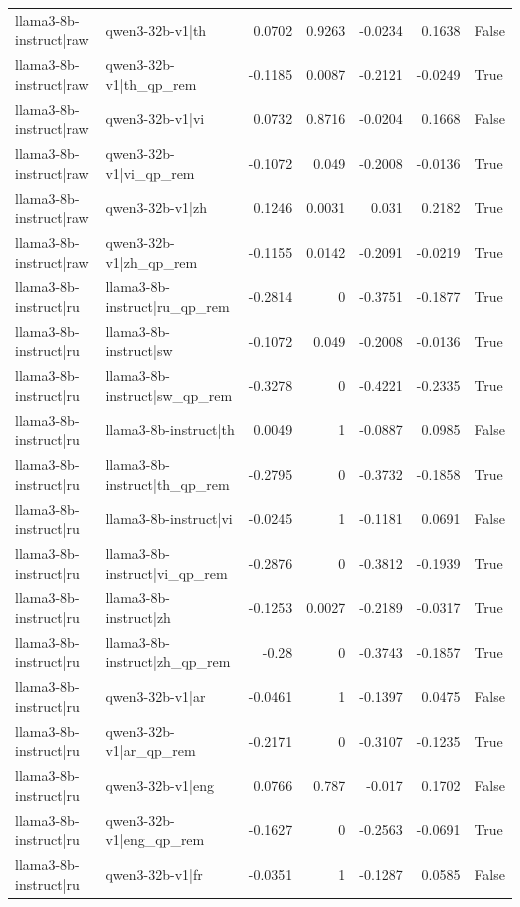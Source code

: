 \begin{table}
\begin{tabular}{l l r r r r l}
llama3-8b-instruct|raw & qwen3-32b-v1|th & 0.0702 & 0.9263 & -0.0234 & 0.1638 & False \\
llama3-8b-instruct|raw & qwen3-32b-v1|th_qp_rem & -0.1185 & 0.0087 & -0.2121 & -0.0249 & True \\
llama3-8b-instruct|raw & qwen3-32b-v1|vi & 0.0732 & 0.8716 & -0.0204 & 0.1668 & False \\
llama3-8b-instruct|raw & qwen3-32b-v1|vi_qp_rem & -0.1072 & 0.049 & -0.2008 & -0.0136 & True \\
llama3-8b-instruct|raw & qwen3-32b-v1|zh & 0.1246 & 0.0031 & 0.031 & 0.2182 & True \\
llama3-8b-instruct|raw & qwen3-32b-v1|zh_qp_rem & -0.1155 & 0.0142 & -0.2091 & -0.0219 & True \\
llama3-8b-instruct|ru & llama3-8b-instruct|ru_qp_rem & -0.2814 & 0 & -0.3751 & -0.1877 & True \\
llama3-8b-instruct|ru & llama3-8b-instruct|sw & -0.1072 & 0.049 & -0.2008 & -0.0136 & True \\
llama3-8b-instruct|ru & llama3-8b-instruct|sw_qp_rem & -0.3278 & 0 & -0.4221 & -0.2335 & True \\
llama3-8b-instruct|ru & llama3-8b-instruct|th & 0.0049 & 1 & -0.0887 & 0.0985 & False \\
llama3-8b-instruct|ru & llama3-8b-instruct|th_qp_rem & -0.2795 & 0 & -0.3732 & -0.1858 & True \\
llama3-8b-instruct|ru & llama3-8b-instruct|vi & -0.0245 & 1 & -0.1181 & 0.0691 & False \\
llama3-8b-instruct|ru & llama3-8b-instruct|vi_qp_rem & -0.2876 & 0 & -0.3812 & -0.1939 & True \\
llama3-8b-instruct|ru & llama3-8b-instruct|zh & -0.1253 & 0.0027 & -0.2189 & -0.0317 & True \\
llama3-8b-instruct|ru & llama3-8b-instruct|zh_qp_rem & -0.28 & 0 & -0.3743 & -0.1857 & True \\
llama3-8b-instruct|ru & qwen3-32b-v1|ar & -0.0461 & 1 & -0.1397 & 0.0475 & False \\
llama3-8b-instruct|ru & qwen3-32b-v1|ar_qp_rem & -0.2171 & 0 & -0.3107 & -0.1235 & True \\
llama3-8b-instruct|ru & qwen3-32b-v1|eng & 0.0766 & 0.787 & -0.017 & 0.1702 & False \\
llama3-8b-instruct|ru & qwen3-32b-v1|eng_qp_rem & -0.1627 & 0 & -0.2563 & -0.0691 & True \\
llama3-8b-instruct|ru & qwen3-32b-v1|fr & -0.0351 & 1 & -0.1287 & 0.0585 & False \\

\end{tabular}
\end{table}

